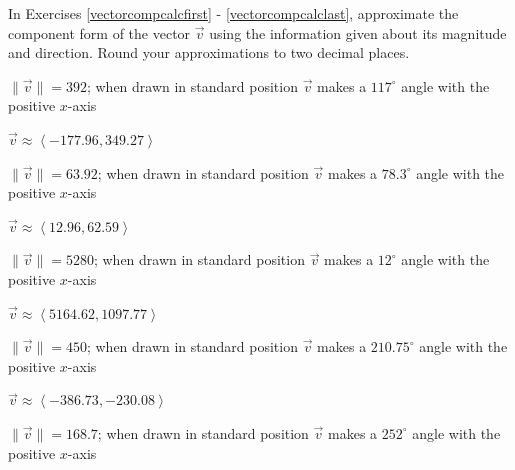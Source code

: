 \documentclass{ximera}
\begin{document}
\begin{question}
In Exercises \ref{vectorcompcalcfirst} - \ref{vectorcompcalclast}, approximate the component form of the vector $\overrightarrow{v}$ using the information given about its magnitude and direction.  Round your approximations to two decimal places.

\begin{problem} \label{vectorcompcalcfirst}
$\|\overrightarrow{v}\| = 392$; when drawn in standard position $\overrightarrow{v}$ makes a $117^{\circ}$ angle with the positive $x$-axis

\begin{solution}
$\overrightarrow{v} \approx \left<-177.96, 349.27\right>$
\end{solution}
\end{problem}

\begin{problem}
$\|\overrightarrow{v}\| = 63.92$; when drawn in standard position $\overrightarrow{v}$ makes a $78.3^{\circ}$ angle with the positive $x$-axis

\begin{solution}
$\overrightarrow{v} \approx \left<12.96, 62.59\right>$
\end{solution}
\end{problem}

\begin{problem}
$\|\overrightarrow{v}\| = 5280$; when drawn in standard position $\overrightarrow{v}$ makes a $12^{\circ}$ angle with the positive $x$-axis 

\begin{solution}
$\overrightarrow{v} \approx \left<5164.62, 1097.77\right>$
\end{solution}
\end{problem}

\begin{problem}
$\|\overrightarrow{v}\| = 450$; when drawn in standard position $\overrightarrow{v}$ makes a $210.75^{\circ}$ angle with the positive $x$-axis 

\begin{solution}
$\overrightarrow{v} \approx \left<-386.73, -230.08\right>$
\end{solution}
\end{problem}

\begin{problem}
$\|\overrightarrow{v}\| = 168.7$; when drawn in standard position $\overrightarrow{v}$ makes a $252^{\circ}$ angle with the positive $x$-axis


\end{problem}
\end{question}
\end{document}
